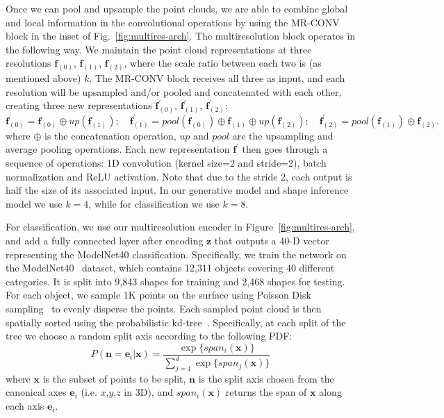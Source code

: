 Once we can pool and upsample the point clouds, we are able to combine global and local information
in the convolutional operations by using the MR-CONV block in the inset of Fig.~\ref{fig:multires-arch}.
The multiresolution block operates in the following way.
We maintain the point cloud representations at three resolutions $\mathbf{f}_{(0)}$, $\mathbf{f}_{(1)}$, $\mathbf{f}_{(2)}$,
where the scale ratio between each two is (as mentioned above) $k$.
The MR-CONV block receives all three as input, and each resolution will be upsampled and/or pooled and concatenated with each other, creating three new representations 
$\mathbf{f}^\prime_{(0)}$, $\mathbf{f}^\prime_{(1)}$, $\mathbf{f}^\prime_{(2)}$:
\begin{equation}
\mathbf{f}^\prime_{(0)} = \mathbf{f}_{(0)} \oplus up(\mathbf{f}_{(1)}); \quad \mathbf{f}^\prime_{(1)} = pool(\mathbf{f}_{(0)}) \oplus \mathbf{f}_{(1)} \oplus up(\mathbf{f}_{(2)}); \quad \mathbf{f}^\prime_{(2)} = pool(\mathbf{f}_{(1)}) \oplus \mathbf{f}_{(2)}. \nonumber
\end{equation}
where $\oplus$ is the concatenation operation, $up$ and $pool$ are the upsampling
and average pooling operations.
Each new representation $\mathbf{f}^\prime$ then goes through a sequence of operations: 1D convolution (kernel size=2 and stride=2), batch normalization and ReLU activation.
Note that due to the stride 2, each output is half the size of its associated input.
In our generative model and shape inference model we use $k=4$, while for classification we use $k=8$.

 For classification, we use our multiresolution encoder in Figure~\ref{fig:multires-arch}, and add a fully connected layer after encoding $\mathbf{z}$ that outputs a 40-D vector representing the ModelNet40 classification. Specifically, we train the network on the ModelNet40~\cite{wu20153d} dataset, which contains 12,311 objects covering 40 different categories. It is split into 9,843 shapes for training and 2,468 shapes for testing. For each object, we sample 1K points on the surface using Poisson Disk sampling~\cite{Bowers:2010:PPD} to evenly disperse the points. Each sampled point cloud is then spatially sorted using the probabilistic kd-tree~\cite{Klokov_2017_ICCV}. Specifically, at each split of the tree we choose a random split axis according to the following PDF:
\begin{equation}
	P(\mathbf{n}=\mathbf{e}_i | \mathbf{x}) = \frac{\exp\{span_i(\mathbf{x})\}}{\sum_{j=1}^{d}\exp\{span_j(\mathbf{x})\}} \nonumber
\end{equation}
where $\mathbf{x}$ is the subset of points to be split, $\mathbf{n}$ is the split axis chosen from the canonical axes $\mathbf{e}_i$ (i.e. $x$,$y$,$z$ in 3D), and $span_i(\mathbf{x})$ returns the span of $\mathbf{x}$ along each axis $\mathbf{e}_i$.

